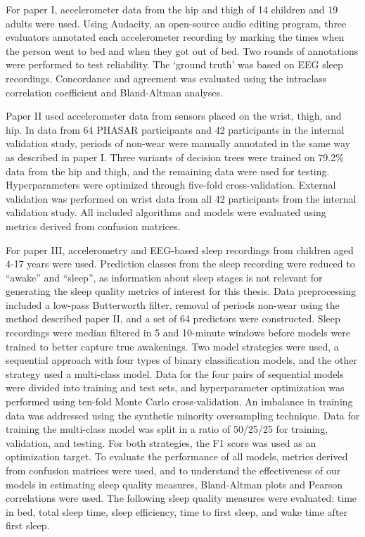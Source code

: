 \documentclass[
  9pt,
]{scrbook}
\begin{document}
For paper I, accelerometer data from the hip and thigh of 14 children
and 19 adults were used. Using Audacity, an open-source audio editing
program, three evaluators annotated each accelerometer recording by
marking the times when the person went to bed and when they got out of
bed. Two rounds of annotations were performed to test reliability. The
`ground truth' was based on EEG sleep recordings. Concordance and
agreement was evaluated using the intraclass correlation coefficient and
Bland-Altman analyses.

Paper II used accelerometer data from sensors placed on the wrist,
thigh, and hip. In data from 64 PHASAR participants and 42 participants
in the internal validation study, periods of non-wear were manually
annotated in the same way as described in paper I. Three variants of
decision trees were trained on 79.2\% data from the hip and thigh, and
the remaining data were used for testing. Hyperparameters were optimized
through five-fold cross-validation. External validation was performed on
wrist data from all 42 participants from the internal validation study.
All included algorithms and models were evaluated using metrics derived
from confusion matrices.

For paper III, accelerometry and EEG-based sleep recordings from
children aged 4-17 years were used. Prediction classes from the sleep
recording were reduced to ``awake'' and ``sleep'', as information about
sleep stages is not relevant for generating the sleep quality metrics of
interest for this thesis. Data preprocessing included a low-pass
Butterworth filter, removal of periods non-wear using the method
described paper II, and a set of 64 predictors were constructed. Sleep
recordings were median filtered in 5 and 10-minute windows before models
were trained to better capture true awakenings. Two model strategies
were used, a sequential approach with four types of binary
classification models, and the other strategy used a multi-class model.
Data for the four pairs of sequential models were divided into training
and test sets, and hyperparameter optimization was performed using
ten-fold Monte Carlo cross-validation. An imbalance in training data was
addressed using the synthetic minority oversampling technique. Data for
training the multi-class model was split in a ratio of 50/25/25 for
training, validation, and testing. For both strategies, the F1 score was
used as an optimization target. To evaluate the performance of all
models, metrics derived from confusion matrices were used, and to
understand the effectiveness of our models in estimating sleep quality
measures, Bland-Altman plots and Pearson correlations were used. The
following sleep quality measures were evaluated: time in bed, total
sleep time, sleep efficiency, time to first sleep, and wake time after
first sleep.
\end{document}

